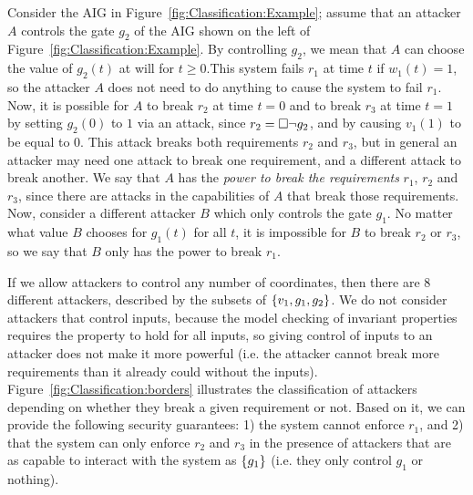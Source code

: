 Consider the AIG in Figure~\ref{fig:Classification:Example}; assume that an attacker $A$ controls the gate $g_2$ of the AIG shown on the left of Figure~\ref{fig:Classification:Example}. By controlling $g_2$, we mean that $A$ can choose the value of $g_2(t)$ at will for $t\geq 0$.This system fails $r_1$ at time $t$ if $w_1(t)=1$, so the attacker $A$ does not need to do anything to cause the system to fail $r_1$. Now, it is possible for $A$ to break $r_2$ at time $t=0$ and to break $r_3$ at time $t=1$ by setting $g_2(0)$ to $1$ via an attack, since $r_2={{\square}} \lnot g_2$, and by causing $v_1(1)$ to be equal to $0$. This attack breaks both requirements $r_2$ and $r_3$, but in general an attacker may need one attack to break one requirement, and a different attack to break another. We say that $A$ has the \emph{power to break the requirements} $r_1$, $r_2$ and $r_3$, since there are attacks in the capabilities of $A$ that break those requirements. Now, consider a different attacker $B$ which only controls the gate $g_1$. No matter what value $B$ chooses for $g_1(t)$ for all $t$, it is impossible for $B$ to break $r_2$ or $r_3$, so we say that $B$ only has the power to break $r_1$. 



If we allow attackers to control any number of coordinates, then there are $8$ different attackers, described by the subsets of $\left\{v_1,g_1,g_2\right\}$. We do not consider attackers that control inputs, because the model checking of invariant properties requires the property to hold for all inputs, so giving control of inputs to an attacker does not make it more powerful (i.e. the attacker cannot break more requirements than it already could without the inputs). Figure~\ref{fig:Classification:borders} illustrates the classification of attackers depending on whether they break a given requirement or not. Based on it, we can provide the following security guarantees: 1) the system cannot enforce $r_1$, and 2) that the system can only enforce $r_2$ and $r_3$ in the presence of attackers that are as capable to interact with the system as $\left\{g_1\right\}$ (i.e. they only control $g_1$ or nothing).

